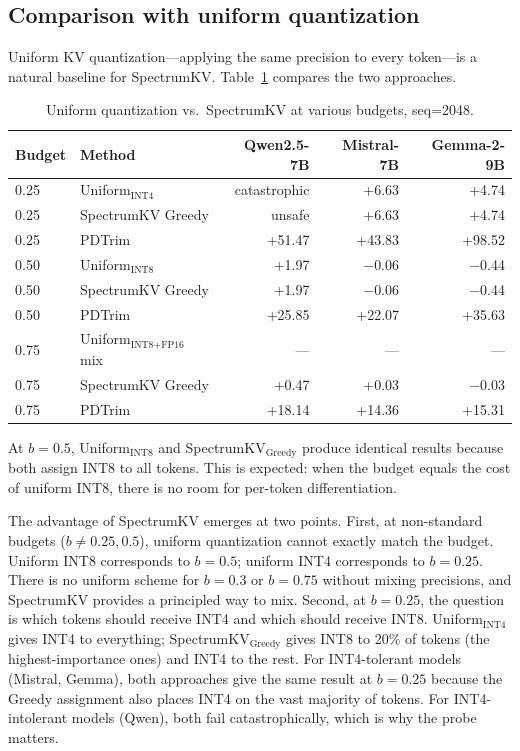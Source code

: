 \documentclass[11pt]{article}
\newcommand{\method}{SpectrumKV}
\newcommand{\budget}{b}
\newcommand{\pct}{\%}
\theoremstyle{plain}
\theoremstyle{definition}
\begin{document}
\subsection{Comparison with uniform quantization}
\label{sec:uniform-comparison}

Uniform KV quantization---applying the same precision to every token---is a natural baseline for \method{}.  Table~\ref{tab:uniform} compares the two approaches.

\begin{table}[t]
\centering
\caption{Uniform quantization vs.\ SpectrumKV at various budgets, seq=2048.}
\label{tab:uniform}
\small
\begin{tabular}{llrrr}
\toprule
Budget & Method & Qwen2.5-7B & Mistral-7B & Gemma-2-9B \\
\midrule
0.25 & Uniform$_{\text{INT4}}$ & catastrophic & +6.63 & +4.74 \\
0.25 & \method{} Greedy & unsafe & +6.63 & +4.74 \\
0.25 & PDTrim & +51.47 & +43.83 & +98.52 \\
\midrule
0.50 & Uniform$_{\text{INT8}}$ & +1.97 & $-$0.06 & $-$0.44 \\
0.50 & \method{} Greedy & +1.97 & $-$0.06 & $-$0.44 \\
0.50 & PDTrim & +25.85 & +22.07 & +35.63 \\
\midrule
0.75 & Uniform$_{\text{INT8+FP16}}$ mix & --- & --- & --- \\
0.75 & \method{} Greedy & +0.47 & +0.03 & $-$0.03 \\
0.75 & PDTrim & +18.14 & +14.36 & +15.31 \\
\bottomrule
\end{tabular}
\end{table}

At $\budget=0.5$, Uniform$_{\text{INT8}}$ and \method{}$_{\text{Greedy}}$ produce identical results because both assign INT8 to all tokens.  This is expected: when the budget equals the cost of uniform INT8, there is no room for per-token differentiation.

The advantage of \method{} emerges at two points.  First, at non-standard budgets ($\budget \ne 0.25, 0.5$), uniform quantization cannot exactly match the budget.  Uniform INT8 corresponds to $\budget=0.5$; uniform INT4 corresponds to $\budget=0.25$.  There is no uniform scheme for $\budget=0.3$ or $\budget=0.75$ without mixing precisions, and \method{} provides a principled way to mix.  Second, at $\budget=0.25$, the question is which tokens should receive INT4 and which should receive INT8.  Uniform$_{\text{INT4}}$ gives INT4 to everything; \method{}$_{\text{Greedy}}$ gives INT8 to 20\pct{} of tokens (the highest-importance ones) and INT4 to the rest.  For INT4-tolerant models (Mistral, Gemma), both approaches give the same result at $\budget=0.25$ because the Greedy assignment also places INT4 on the vast majority of tokens.  For INT4-intolerant models (Qwen), both fail catastrophically, which is why the probe matters.
\end{document}
